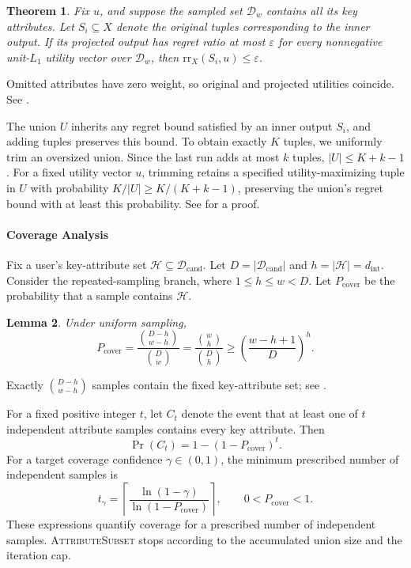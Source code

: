 \documentclass[conference]{IEEEtran}
\newtheorem{theorem}{Theorem}[section]
\newtheorem{lemma}[theorem]{Lemma}
\theoremstyle{definition}
\theoremstyle{plain}
\newcommand{\technicalreport}{\iftoggle{LinkTechnicalReport}{\href{https://github.com/JunyuLiao/High-dimensional-Regret-Minimization/blob/main/docs/TechnicalReport.pdf}{technical report}}{technical report}}
\begin{document}
\begin{theorem}\label{theorem_att}
    Fix $u$, and suppose the sampled set $\mathcal{D}_w$ contains all its key attributes. Let $S_i\subseteq X$ denote the original tuples corresponding to the inner output. If its projected output has regret ratio at most $\varepsilon$ for every nonnegative unit-$L_1$ utility vector over $\mathcal{D}_w$, then $\mathrm{rr}_X(S_i,u)\leq\varepsilon$.
\end{theorem}

Omitted attributes have zero weight, so original and projected utilities coincide. See \iftoggle{TechnicalReport}{Section~\ref{appen:proof} of the \technicalreport}{Appendix~\ref{appen:proof}}.

The union $U$ inherits any regret bound satisfied by an inner output $S_i$, and adding tuples preserves this bound. To obtain exactly $K$ tuples, we uniformly trim an oversized union. Since the last run adds at most $k$ tuples, $|U|\leq K+k-1$. For a fixed utility vector $u$, trimming retains a specified utility-maximizing tuple in $U$ with probability $K/|U|\geq K/(K+k-1)$, preserving the union's regret bound with at least this probability. See \iftoggle{TechnicalReport}{Section~\ref{appen:proof} of the \technicalreport}{Appendix~\ref{appen:proof}} for a proof.

\paragraph{\textbf{Coverage Analysis}}
Fix a user's key-attribute set $\mathcal{H}\subseteq\mathcal{D}_\text{cand}$. Let $D=|\mathcal{D}_\text{cand}|$ and $h=|\mathcal{H}|=d_\text{int}$. Consider the repeated-sampling branch, where $1\leq h\leq w<D$. Let $P_\text{cover}$ be the probability that a sample contains $\mathcal{H}$.
\begin{lemma}\label{lemma_p}
    Under uniform sampling,
    \[
    P_\text{cover}=\frac{\binom{D-h}{w-h}}{\binom Dw}
    =\frac{\binom wh}{\binom Dh}
    \geq\left(\frac{w-h+1}{D}\right)^h.
    \]
\end{lemma}

Exactly $\binom{D-h}{w-h}$ samples contain the fixed key-attribute set; see \iftoggle{TechnicalReport}{Section~\ref{appen:proof} of the \technicalreport}{Appendix~\ref{appen:proof}}.

For a fixed positive integer $t$, let $C_t$ denote the event that at least one of $t$ independent attribute samples contains every key attribute. Then
\[
\Pr(C_t)=1-(1-P_\text{cover})^t.
\]
For a target coverage confidence $\gamma\in(0,1)$, the minimum prescribed number of independent samples is
\[
t_\gamma=\left\lceil\frac{\ln(1-\gamma)}{\ln(1-P_\text{cover})}\right\rceil,
\qquad 0<P_\text{cover}<1.
\]
These expressions quantify coverage for a prescribed number of independent samples. \textsc{AttributeSubset} stops according to the accumulated union size and the iteration cap.
\end{document}
